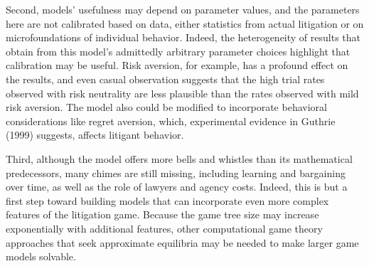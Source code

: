 \documentclass{article}
\begin{document}
Second, models' usefulness may depend on parameter values, and the parameters here are not calibrated based on data, either statistics from actual litigation or on microfoundations of individual behavior. Indeed, the heterogeneity of results that obtain from this model's admittedly arbitrary  parameter choices highlight that calibration may be useful. Risk aversion, for example, has a profound effect on the results, and even casual observation suggests that the high trial rates observed with risk neutrality are less plausible than the rates observed with mild risk aversion. The model also could be modified to incorporate behavioral considerations like regret aversion, which, experimental evidence in Guthrie (1999) \cite{guthrie} suggests, affects litigant behavior.

Third, although the model offers more bells and whistles than its mathematical predecessors, many chimes are still missing, including learning and bargaining over time, as well as the role of lawyers and agency costs. Indeed, this is but a first step toward building models that can incorporate even more complex features of the litigation game. Because the game tree size may increase exponentially with additional features, other computational game theory approaches that seek approximate equilibria may be needed to make larger game models solvable. 

\printbibliography
\end{document}
